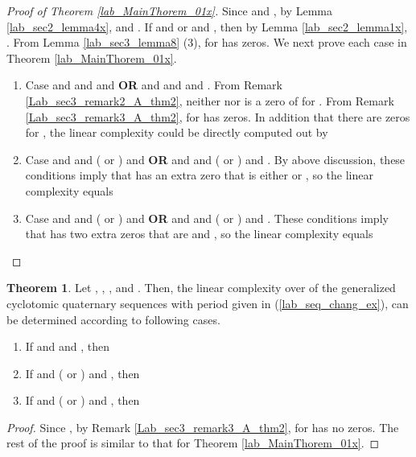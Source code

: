 \documentclass{mcom-l}
\theoremstyle{definition}
\newtheorem{sec3thm1xx}[sec3thm1]{Theorem}
\numberwithin{equation}{section}
\begin{document}
     \begin{proof}[Proof of Theorem \ref{lab_MainThorem_01x}]
     Since  and , by Lemma \ref{lab_sec2_lemma4x},  and . If  and  or  and , then by Lemma \ref{lab_sec2_lemma1x}, . From Lemma \ref{lab_sec3_lemma8} (3),  for  has  zeros. We next prove each case in Theorem \ref{lab_MainThorem_01x}.
     \begin{enumerate}
     \item Case  and  and  and  \textbf{OR}  and  and  and . From Remark \ref{Lab_sec3_remark2_A_thm2}, neither  nor  is a zero of  for . From Remark \ref{Lab_sec3_remark3_A_thm2},  for  has  zeros. In addition that there are  zeros for , the linear complexity could be directly computed out by 
     
     \item Case  and  and ( or ) and  \textbf{OR}  and  and ( or ) and . By above discussion, these conditions imply that  has an extra zero that is either  or , so the linear complexity equals
        
     \item Case  and  and ( or ) and  \textbf{OR}  and  and ( or ) and . These conditions imply that  has two extra zeros that are   and , so the linear complexity equals
           
     \end{enumerate}
     \end{proof}
     
       \begin{sec3thm1xx}\label{lab_MainThorem_01xx}
       Let , , , and . Then, the linear complexity over  of the generalized cyclotomic quaternary sequences with period  given in (\ref{lab_seq_chang_ex}),  can be determined according to following cases.
           \begin{enumerate} \item If    and  and , then
           
            \item If   and ( or ) and , then
               
            \item If   and ( or ) and , then
                 
                 \end{enumerate}
       \end{sec3thm1xx} 
        \begin{proof}
        Since , by Remark \ref{Lab_sec3_remark3_A_thm2},  for  has no zeros. The rest of the proof is similar to that for Theorem \ref{lab_MainThorem_01x}.
        \end{proof}
\end{document}
